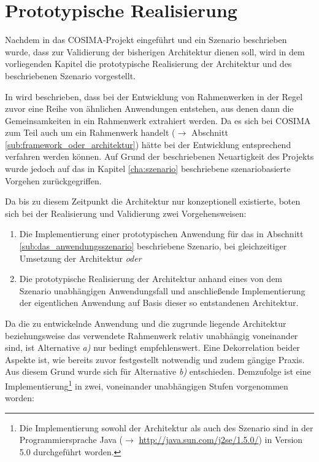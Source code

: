 
\chapter{Prototypische Realisierung} %
\label{cha:prototypische_realisierung}

  Nachdem in das COSIMA-Projekt eingeführt und ein Szenario beschrieben wurde, dass zur Validierung der bisherigen Architektur dienen soll, wird in dem vorliegenden Kapitel die prototypische Realisierung der Architektur und des beschriebenen Szenario vorgestellt.
  
  In \citep{handbuch_der_software_architektur} wird beschrieben, dass bei der Entwicklung von Rahmenwerken in der Regel zuvor eine Reihe von ähnlichen Anwendungen entstehen, aus denen dann die Gemeinsamkeiten in ein Rahmenwerk extrahiert werden. Da es sich bei COSIMA zum Teil auch um ein Rahmenwerk handelt ($\to$ Abschnitt \ref{sub:framework_oder_architektur}) hätte bei der Entwicklung entsprechend verfahren werden können. Auf Grund der beschriebenen Neuartigkeit des Projekts wurde jedoch auf das in Kapitel \ref{cha:szenario} beschriebene szenariobasierte Vorgehen zurückgegriffen.
  
  Da bis zu diesem Zeitpunkt die Architektur nur konzeptionell existierte, boten sich bei der Realisierung und Validierung zwei Vorgehensweisen:

  \begin{enumerate}[\slshape a)]
    \item Die Implementierung einer prototypischen Anwendung für das in Abschnitt \ref{sub:das_anwendungsszenario} beschriebene Szenario, bei gleichzeitiger Umsetzung der Architektur \emph{oder}
    \item Die prototypische Realisierung der Architektur anhand eines von dem Szenario unabhängigen Anwendungsfall und anschließende Implementierung der eigentlichen Anwendung auf Basis dieser so entstandenen Architektur.
  \end{enumerate}
  
  Da die zu entwickelnde Anwendung und die zugrunde liegende Architektur beziehungsweise das verwendete Rahmenwerk relativ unabhängig voneinander sind, ist Alternative \emph{a)} nur bedingt empfehlenswert. Eine Dekorrelation beider Aspekte ist, wie bereits zuvor festgestellt notwendig und zudem gängige Praxis. Aus diesem Grund wurde sich für Alternative \emph{b)} entschieden. Demzufolge ist eine Implementierung\footnote{Die Implementierung sowohl der Architektur als auch des Szenario sind in der Programmiersprache Java ($\to$ \url{http://java.sun.com/j2se/1.5.0/}) in Version 5.0 durchgeführt worden.} in zwei, voneinander unabhängigen Stufen vorgenommen worden:
  
